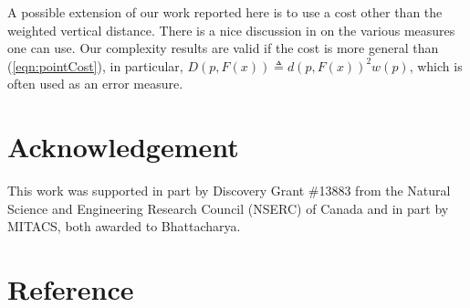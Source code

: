 \documentclass[preprint,10pt]{elsarticle}
\begin{document}
A possible extension of our work reported here is to use a cost other than the weighted vertical distance.
There is a nice discussion in \cite{guha2007} on the various measures one can use. 
Our complexity results are valid
if the cost is more general than (\ref{eqn:pointCost}),
in particular, $D(p, F(x))\triangleq d(p, F(x))^2 w(p)$,
which is often used as an error measure.
\section*{Acknowledgement}\label{sec:ack}
This work was supported in part by Discovery Grant \#13883 from
the Natural Science and Engineering Research Council (NSERC) of Canada and in part by MITACS,
both awarded to Bhattacharya.


\section*{Reference}
\end{document}
